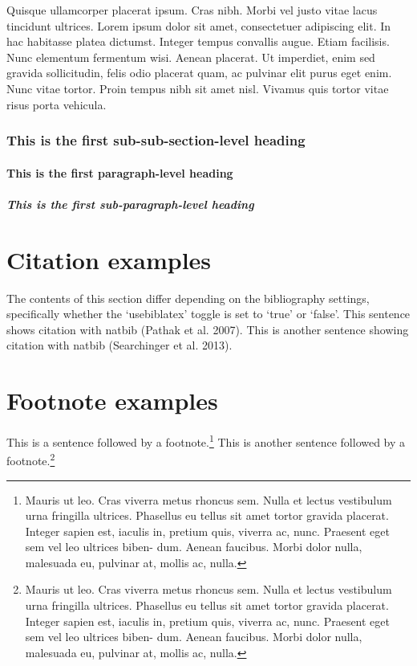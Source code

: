 \documentclass[letterpaper,             %
               oneside,                 %
               \pointsize]              %
               {memoir}
\begin{document}
Quisque ullamcorper placerat ipsum. Cras nibh. Morbi vel justo vitae
lacus tincidunt ultrices. Lorem ipsum dolor sit amet, consectetuer
adipiscing elit. In hac habitasse platea dictumst. Integer tempus
convallis augue. Etiam facilisis. Nunc elementum fermentum wisi. Aenean
placerat. Ut imperdiet, enim sed gravida sollicitudin, felis odio
placerat quam, ac pulvinar elit purus eget enim. Nunc vitae tortor.
Proin tempus nibh sit amet nisl. Vivamus quis tortor vitae risus porta
vehicula.

\hypertarget{this-is-the-first-sub-sub-section-level-heading}{%
\subsubsection{This is the first sub-sub-section-level
heading}\label{this-is-the-first-sub-sub-section-level-heading}}

\hypertarget{this-is-the-first-paragraph-level-heading}{%
\paragraph{This is the first paragraph-level
heading}\label{this-is-the-first-paragraph-level-heading}}

\hypertarget{this-is-the-first-sub-paragraph-level-heading}{%
\subparagraph{This is the first sub-paragraph-level
heading}\label{this-is-the-first-sub-paragraph-level-heading}}

\hypertarget{citation-examples}{%
\section{Citation examples}\label{citation-examples}}

The contents of this section differ depending on the bibliography
settings, specifically whether the `usebiblatex' toggle is set to `true'
or `false'. This sentence shows citation with natbib (Pathak et al.
2007). This is another sentence showing citation with natbib
(Searchinger et al. 2013).

\hypertarget{footnote-examples}{%
\section{Footnote examples}\label{footnote-examples}}

This is a sentence followed by a footnote.\footnote{Mauris ut leo. Cras
  viverra metus rhoncus sem. Nulla et lectus vestibulum urna fringilla
  ultrices. Phasellus eu tellus sit amet tortor gravida placerat.
  Integer sapien est, iaculis in, pretium quis, viverra ac, nunc.
  Praesent eget sem vel leo ultrices biben- dum. Aenean faucibus. Morbi
  dolor nulla, malesuada eu, pulvinar at, mollis ac, nulla.} This is
another sentence followed by a footnote.\footnote{Mauris ut leo. Cras
  viverra metus rhoncus sem. Nulla et lectus vestibulum urna fringilla
  ultrices. Phasellus eu tellus sit amet tortor gravida placerat.
  Integer sapien est, iaculis in, pretium quis, viverra ac, nunc.
  Praesent eget sem vel leo ultrices biben- dum. Aenean faucibus. Morbi
  dolor nulla, malesuada eu, pulvinar at, mollis ac, nulla.}
\end{document}
